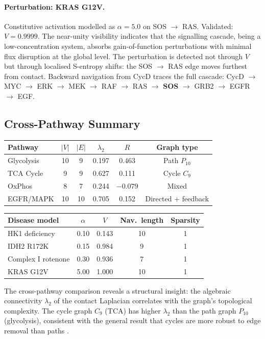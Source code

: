 \documentclass[11pt,twocolumn]{article}
\theoremstyle{plain}
\theoremstyle{definition}
\begin{document}
\paragraph{Perturbation: KRAS G12V.}
Constitutive activation modelled as $\alpha = 5.0$ on SOS $\to$ RAS.
Validated: $V = 0.9999$. The near-unity visibility indicates that the
signalling cascade, being a low-concentration system, absorbs gain-of-function
perturbations with minimal flux disruption at the global level. The
perturbation is detected not through $V$ but through localised S-entropy
shifts: the SOS $\to$ RAS edge moves furthest from contact.
Backward navigation from CycD traces the full cascade: CycD $\to$ MYC $\to$
ERK $\to$ MEK $\to$ RAF $\to$ RAS $\to$ \textbf{SOS} $\to$ GRB2 $\to$
EGFR $\to$ EGF.

\subsection{Cross-Pathway Summary}

\begin{center}
\begin{tabular}{lccccc}
\toprule
Pathway & $|V|$ & $|E|$ & $\lambda_2$ & $R$ & Graph type \\
\midrule
Glycolysis  & 10 & 9  & 0.197 & 0.463 & Path $P_{10}$ \\
TCA Cycle   & 9  & 9  & 0.627 & 0.111 & Cycle $C_9$ \\
OxPhos      & 8  & 7  & 0.244 & $-0.079$ & Mixed \\
EGFR/MAPK   & 10 & 10 & 0.705 & 0.152 & Directed + feedback \\
\bottomrule
\end{tabular}
\end{center}

\begin{center}
\begin{tabular}{lcccc}
\toprule
Disease model & $\alpha$ & $V$ & Nav.\ length & Sparsity \\
\midrule
HK1 deficiency     & 0.10 & 0.143 & 10 & 1 \\
IDH2 R172K         & 0.15 & 0.984 &  9 & 1 \\
Complex I rotenone  & 0.30 & 0.936 &  7 & 1 \\
KRAS G12V           & 5.00 & 1.000 & 10 & 1 \\
\bottomrule
\end{tabular}
\end{center}

The cross-pathway comparison reveals a structural insight: the algebraic
connectivity $\lambda_2$ of the contact Laplacian correlates with the graph's
topological complexity. The cycle graph $C_9$ (TCA) has higher $\lambda_2$
than the path graph $P_{10}$ (glycolysis), consistent with the general result
that cycles are more robust to edge removal than paths
\cite{chung1997spectral}.
\end{document}
